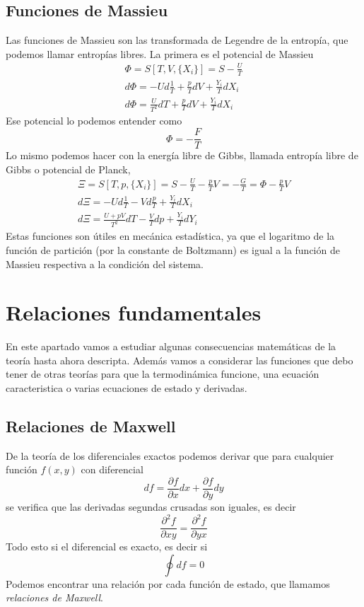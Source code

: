 \subsection{Funciones de Massieu}
Las funciones de Massieu son las transformada de Legendre de la entropía, que podemos llamar entropías libres.
La primera es el potencial de Massieu
\begin{equation}
\begin{gathered}
\Phi = S[T,V,\{X_i\}] = S - \frac{U}{T}\\
d\Phi = -U d\frac{1}{T} + \frac{p}{T} dV + \frac{Y_i}{T} dX_i\\
d\Phi = \frac{U}{T^2} dT + \frac{p}{T} dV + \frac{Y_i}{T} dX_i
\end{gathered}
\end{equation}
Ese potencial lo podemos entender como
\begin{equation}
\Phi = - \frac{F}{T}
\end{equation}
Lo mismo podemos hacer con la energía libre de Gibbs, llamada entropía libre de Gibbs o potencial de Planck,
\begin{equation}
\begin{gathered}
\Xi = S[T,p,\{X_i\}] = S - \frac{U}{T} - \frac{p}{T} V = - \frac{G}{T} = \Phi - \frac{p}{T} V\\
d\Xi = -U d\frac{1}{T} - V d\frac{p}{T} + \frac{Y_i}{T} dX_i\\
d\Xi = \frac{U + p V}{T^2} dT - \frac{V}{T} dp + \frac{Y_i}{T} dY_i
\end{gathered}
\end{equation}
Estas funciones son útiles en mecánica estadística, ya que el logaritmo de la función de partición (por la constante de Boltzmann) es igual a la función de Massieu respectiva a la condición del sistema.
\section{Relaciones fundamentales}
En este apartado vamos a estudiar algunas consecuencias matemáticas de la teoría hasta ahora descripta.
Además vamos a considerar las funciones que debo tener de otras teorías para que la termodinámica funcione, una ecuación caracteristica o varias ecuaciones de estado y derivadas.
\subsection{Relaciones de Maxwell}
De la teoría de los diferenciales exactos podemos derivar que para cualquier función $f(x,y)$ con diferencial
\[df = \frac{\partial f}{\partial x} dx + \frac{\partial f}{\partial y} dy\]
se verifica que las derivadas segundas crusadas son iguales, es decir
\[\frac{\partial^2 f}{\partial x y} = \frac{\partial^2 f}{\partial y x}\]
Todo esto si el diferencial es exacto, es decir si
\[\oint df = 0\]
Podemos encontrar una relación por cada función de estado, que llamamos \emph{relaciones de Maxwell}.
